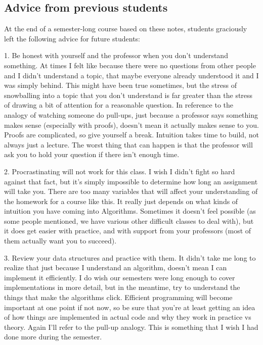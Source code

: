 \documentclass[11pt]{article}
\begin{document}
\newpage

\subsection{Advice from previous students}\label{prelim: sec: advice}

At the end of a semester-long course based on these notes, students graciously left the following advice for future students:

\noindent \hrulefill 

1. Be honest with yourself and the professor when you don't understand something. At times I felt like because there were no questions from other people and I didn't understand a topic, that maybe everyone already understood it and I was simply behind. This might have been true sometimes, but the stress of snowballing into a topic that you don't understand is far greater than the stress of drawing a bit of attention for a reasonable question. In reference to the analogy of watching someone do pull-ups, just because a professor says something makes sense (especially with proofs), doesn't mean it actually makes sense to you. Proofs are complicated, so give yourself a break. Intuition takes time to build, not always just a lecture. The worst thing that can happen is that the professor will ask you to hold your question if there isn't enough time.

2. Procrastinating will not work for this class. I wish I didn't fight so hard against that fact, but it's simply impossible to determine how long an assignment will take you. There are too many variables that will affect your understanding of the homework for a course like this. It really just depends on what kinds of intuition you have coming into Algorithms. Sometimes it doesn't feel possible (as some people mentioned, we have various other difficult classes to deal with), but it does get easier with practice, and with support from your professors (most of them actually want you to succeed).

3. Review your data structures and practice with them. It didn't take me long to realize that just because I understand an algorithm, doesn't mean I can implement it efficiently. I do wish our semesters were long enough to cover implementations in more detail, but in the meantime, try to understand the things that make the algorithms click. Efficient programming will become important at one point if not now, so be sure that you're at least getting an idea of how things are implemented in actual code and why they work in practice vs theory. Again I'll refer to the pull-up analogy. This is something that I wish I had done more during the semester.
\end{document}
